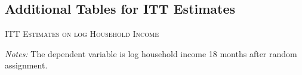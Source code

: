 \begin{appendices}
\newpage

\subsection{Additional Tables for ITT Estimates} \label{appendix_itt_estimates}

\begin{table}[H]
\centering
\caption{\textsc{ITT Estimates on log Household Income}}
\addtolength{\tabcolsep}{24pt}

\addtolength{\tabcolsep}{-24pt}

\medskip


\label{tab:table_complete_nocontr}
\bigskip
\raggedright
\footnotesize
\textit{Notes:} The dependent variable is log household income 18 months after random assignment. \\
\end{table}

\end{appendices}
